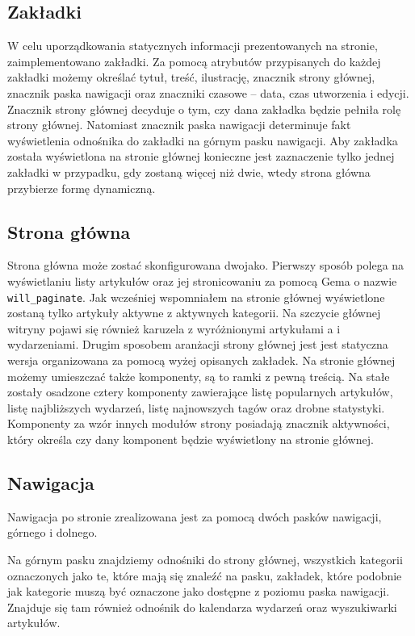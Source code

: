\documentclass[openright]{xmgr}
\begin{document}
\newpage

\subsection{Zakładki}
W celu uporządkowania statycznych informacji prezentowanych na stronie, zaimplementowano zakładki. Za pomocą atrybutów przypisanych do każdej zakładki możemy określać tytuł, treść, ilustrację, znacznik strony głównej, znacznik paska nawigacji oraz znaczniki czasowe – data, czas utworzenia i edycji. Znacznik strony głównej decyduje o tym, czy dana zakładka będzie pełniła rolę strony głównej. Natomiast znacznik paska nawigacji determinuje fakt wyświetlenia odnośnika do zakładki na górnym pasku nawigacji. Aby zakładka została wyświetlona na stronie głównej konieczne jest zaznaczenie tylko jednej zakładki w przypadku, gdy zostaną więcej niż dwie, wtedy strona główna przybierze formę dynamiczną.

\subsection{Strona główna}
Strona główna może zostać skonfigurowana dwojako. Pierwszy sposób polega na wyświetlaniu listy artykułów oraz jej stronicowaniu za pomocą Gema o nazwie \texttt{will\_paginate}\cite{willpaginate}. Jak wcześniej wspomniałem na stronie głównej wyświetlone zostaną tylko artykuły aktywne z aktywnych kategorii. Na szczycie głównej witryny pojawi się również karuzela z wyróżnionymi artykułami a i wydarzeniami. Drugim sposobem aranżacji strony głównej jest jest statyczna wersja organizowana za pomocą wyżej opisanych zakładek. Na stronie głównej możemy umieszczać także komponenty, są to ramki z pewną treścią. Na stałe zostały osadzone cztery komponenty zawierające listę popularnych artykułów, listę najbliższych wydarzeń, listę najnowszych tagów oraz drobne statystyki. Komponenty za wzór innych modułów strony posiadają znacznik aktywności, który określa czy dany komponent będzie wyświetlony na stronie głównej. 

\newpage

\subsection{Nawigacja}
Nawigacja po stronie zrealizowana jest za pomocą dwóch pasków nawigacji, górnego i dolnego. 

Na górnym pasku znajdziemy odnośniki do strony głównej, wszystkich kategorii oznaczonych jako te, które mają się znaleźć na pasku, zakładek, które podobnie jak kategorie muszą być oznaczone jako dostępne z poziomu paska nawigacji. Znajduje się tam również odnośnik do kalendarza wydarzeń oraz wyszukiwarki artykułów.
\end{document}
